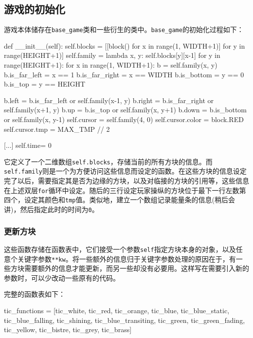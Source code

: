\documentclass[UTF8]{article}
\begin{document}
\subsection{游戏的初始化}

游戏本体储存在\verb|base_game|类和一些衍生的类中。\verb|base_game|的初始化过程如下：
\begin{python}
    def __init__(self):
        self.blocks = [[block() for x in range(1, WIDTH+1)] for y in range(HEIGHT+1)]
        self.family = lambda x, y: self.blocks[y][x-1]
        for y in range(HEIGHT+1):
            for x in range(1, WIDTH+1):
                b = self.family(x, y)
                b.is_far_left  = x == 1
                b.is_far_right = x == WIDTH
                b.is_bottom    = y == 0
                b.is_top       = y == HEIGHT
                
                b.left  = b.is_far_left  or self.family(x-1, y)
                b.right = b.is_far_right or self.family(x+1, y)
                b.up    = b.is_top       or self.family(x, y+1)
                b.down  = b.is_bottom    or self.family(x, y-1)
        self.cursor = self.family(4, 0)
        self.cursor.color = block.RED
        self.cursor.tmp = MAX_TMP // 2

        [...]
        self.time= 0
\end{python}
它定义了一个二维数组\texttt{self.blocks}，存储当前的所有方块的信息。而\texttt{self.family}则是一个为方便访问这些信息而设定的函数。在这些方块的信息设定完了以后，需要指定其是否为边缘的方块，以及对临接的方块的引用等，这些信息在上述双层\texttt{for}循环中设定。随后的三行设定玩家操纵的方块位于最下一行左数第四个，设定其颜色和\texttt{tmp}值。类似地，建立一个数组记录能量条的信息(稍后会讲)，然后指定此时的时间为\texttt{0}。

\subsubsection{更新方块}
这些函数存储在函数表中，它们接受一个参数\texttt{self}指定方块本身的对象，以及任意个关键字参数\verb|**kw|。将一些额外的信息归于关键字参数处理的原因在于，有一些方块需要额外的信息才能更新，而另一些却没有必要用。这样写在需要引入新的参数时，可以少改动一些原有的代码。

完整的函数表如下：
\begin{python}
tic_functions = [tic_white, tic_red, tic_orange, tic_blue, tic_blue_static, tic_blue_falling, tic_shining, tic_blue_transiting, tic_green, tic_green_fading, tic_yellow, tic_bistre, tic_grey, tic_brass]
\end{python}
\end{document}
